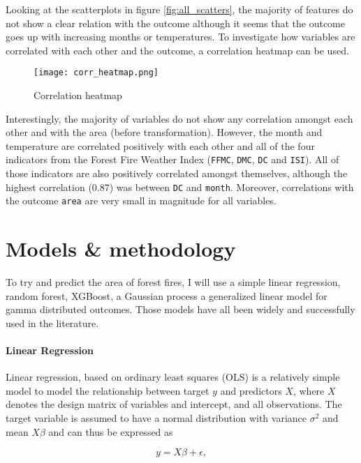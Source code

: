 \documentclass{article}
\begin{document}
Looking at the scatterplots in figure \ref{fig:all_scatters}, the majority of features do not show a clear relation with the outcome although it seems that the outcome goes up with increasing months or temperatures. To investigate how variables are correlated with each other and the outcome, a correlation heatmap can be used.

\begin{figure}[!htbp]
    \centering
    \texttt{[image: corr\_heatmap.png]}
    \caption{Correlation heatmap}
    \label{fig:corr_heatmap}
\end{figure}

Interestingly, the majority of variables do not show any correlation amongst each other and with the area (before transformation). However, the month and temperature are correlated positively with each other and all of the four indicators from the Forest Fire Weather Index (\texttt{FFMC}, \texttt{DMC}, \texttt{DC} and \texttt{ISI}). All of those indicators are also positively correlated amongst themselves, although the highest correlation (0.87) was between \texttt{DC} and \texttt{month}. Moreover, correlations with the outcome \texttt{area} are very small in magnitude for all variables.

\section{Models \& methodology}

To try and predict the area of forest fires, I will use a simple linear regression, random forest, XGBoost, a Gaussian process a generalized linear model for gamma distributed outcomes. Those models have all been widely and successfully used in the literature.

\paragraph{Linear Regression} Linear regression, based on ordinary least squares (OLS) is a relatively simple model to model the relationship between target $y$ and predictors $X$, where $X$ denotes the design matrix of variables and intercept, and all observations. The target variable is assumed to have a normal distribution with variance $\sigma^2$ and mean $X\beta$ and can thus be expressed as

\begin{equation}
    \label{eq:ols}
    y = X\beta + \epsilon,
\end{equation}
\end{document}
